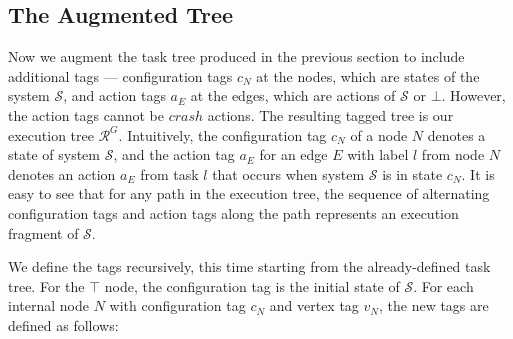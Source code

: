\documentclass[11pt]{article}
\numberwithin{theorem}{section}
\begin{document}
\subsection{The Augmented Tree}\label{subsec:TheAugmentedTree}



Now we augment the task tree produced in the previous section to
include additional tags --- configuration tags $c_N$ at the nodes, which are states of
the system $\mathcal{S}$, and action tags $a_E$ at the edges, which are actions of $\mathcal{S}$
or $\bot$. However, the action tags cannot be $crash$ actions.
The resulting tagged tree is our execution tree $\mathcal{R}^G$. Intuitively, the configuration tag $c_N$ of a node $N$ denotes a state of system $\mathcal{S}$, and the action tag $a_E$ for an edge $E$ with label $l$ from node $N$ denotes an action $a_E$ from task $l$ that occurs when system $\mathcal{S}$ is in state $c_N$. It is easy to see that for any path in the execution tree, the sequence of alternating configuration tags and action tags along the path represents an execution fragment of $\mathcal{S}$.

We define the tags recursively, this time starting from the
already-defined task tree.
For the $\top$ node, the configuration tag is the initial state of
$\mathcal{S}$.
For each internal node $N$ with configuration tag $c_N$ and vertex tag $v_N$,
the new tags are defined as follows:
\end{document}
